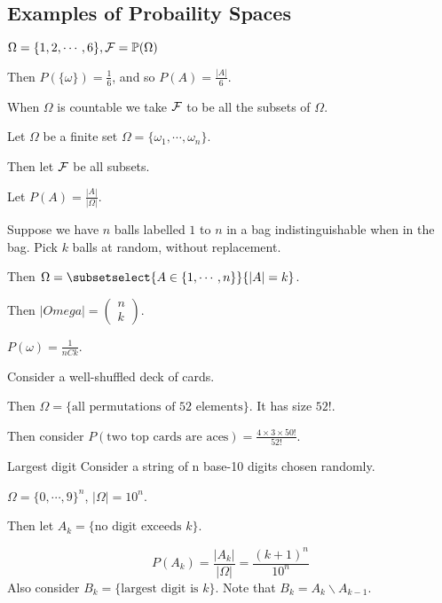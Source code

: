 \documentclass[../Main.tex]{subfiles}
\begin{document}
\subsection{Examples of Probaility Spaces}
\begin{example}
    $\Omega = \{1, 2, \cdots, 6\}, \mathcal{F} = \mathbb{P}(\Omega)$\par %
        Then $P(\{\omega\}) = \frac{1}{6}$, and so $P(A) = \frac{|A|}{6}$.
\end{example}
\begin{remark}
    When $\Omega$ is countable we take $\mathcal{F}$ to be all the subsets of $\Omega$.
\end{remark}
\begin{example}
    Let $\Omega$ be a finite set $\Omega = \{\omega_1, \cdots, \omega_n\}$.\par
    Then let $\mathcal{F}$ be all subsets.\par
    Let $P(A) = \frac{|A|}{|\Omega|}$.
\end{example}
\begin{example}
    Suppose we have $n$ balls labelled $1$ to $n$ in a bag indistinguishable when in the bag. Pick $k$ balls at random, without replacement.\par
    Then $\Omega = \subsetselect{A \in \{1, \cdots, n\}}{|A| = k}$.\par
    Then $|Omega| = \begin{pmatrix}n \\ k\end{pmatrix}$.\par
    $P(\omega) = \frac{1}{nCk}$.
\end{example}
\begin{example}
    Consider a well-shuffled deck of cards.\par
    Then $\Omega = \{\text{all permutations of 52 elements}\}$. It has size $52!$.\par
    Then consider $P(\text{two top cards are aces}) = \frac{4 \times 3 \times 50!}{52!}$.
\end{example}
\begin{example}{Largest digit}
    Consider a string of n base-10 digits chosen randomly.\par
    $\Omega = \{0, \cdots, 9\}^n$, $|\Omega| = 10^n$.\par
    Then let $A_k=\{\text{no digit exceeds } k\}$.\par
    \begin{equation*}
        P(A_k) = \frac{|A_k|}{|\Omega|} = \frac{(k + 1)^n}{10^n}
    \end{equation*}
    Also consider $B_k = \{\text{largest digit is } k\}$. Note that $B_k = A_k \backslash A_{k - 1}$.
\end{example}
\end{document}
